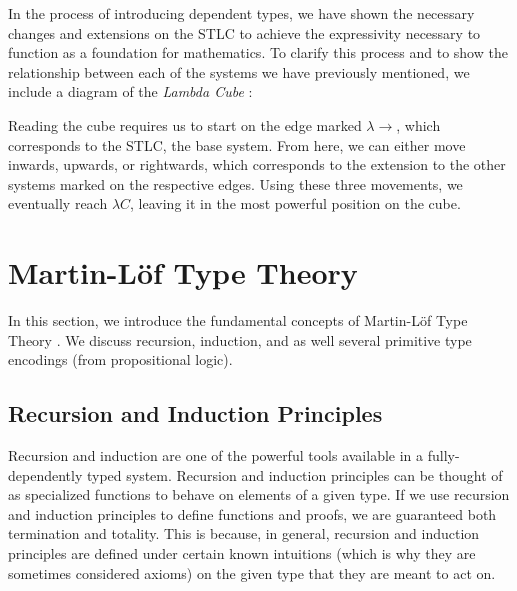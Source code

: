 \documentclass[12pt]{article}
\begin{document}
In the process of introducing dependent types, we have shown the necessary
changes and extensions on the STLC to achieve the expressivity necessary to
function as a foundation for mathematics. To clarify this process and to show
the relationship between each of the systems we have previously mentioned, we
include a diagram of the {\em Lambda Cube} \cite{}:
\begin{center}
\end{center}
Reading the cube requires us to start on the edge marked \(\lambda\!\!\rightarrow\),
which corresponds to the STLC, the base system. From here, we can either move
inwards, upwards, or rightwards, which corresponds to the extension to the other
systems marked on the respective edges. Using these three movements, we
eventually reach \(\lambda C\), leaving it in the most powerful position
on the cube.

\section{Martin-L\"of Type Theory}
In this section, we introduce the fundamental concepts of Martin-L\"of Type
Theory \cite{}. We discuss recursion, induction, and as well several primitive type
encodings (from propositional logic).

\subsection*{Recursion and Induction Principles}
Recursion and induction are one of the powerful tools available in a
fully-dependently typed system. Recursion and induction principles can be
thought of as specialized functions to behave on elements of a given type.
If we use recursion and induction principles to define functions and proofs,
we are guaranteed both termination and totality. This is because, in general,
recursion and induction principles are defined under certain known intuitions
(which is why they are sometimes considered axioms) on the given type that
they are meant to act on.
\end{document}
